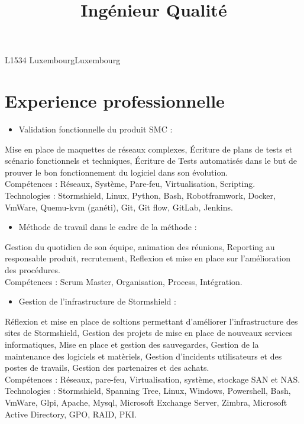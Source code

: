 

\title{Ingénieur Qualité} 
\address{57, rue de la forêt}{L1534 Luxembourg}{Luxembourg}


\makecvtitle
\section{Experience professionnelle}
		{
			\begin{itemize}
				\item Validation fonctionnelle du produit SMC :
			\end{itemize}
			Mise en place de maquettes de réseaux complexes, Écriture de plans de tests et scénario fonctionnels et techniques, Écriture de Tests automatisés dans le but de prouver le bon fonctionnement du logiciel dans son évolution.\\
			\textcolor{myblue}{Compétences : Réseaux, Système, Pare-feu, Virtualisation, Scripting.}\\
			\textcolor{myblue}{Technologies : Stormshield, Linux, Python, Bash, Robotframwork, Docker, VmWare, Quemu-kvm (ganéti), Git, Git flow, GitLab, Jenkins.}
			\begin{itemize}
				\item Méthode de travail dans le cadre de la méthode :
			\end{itemize}
			Gestion du quotidien de son équipe, animation des réunions, Reporting au responsable produit, recrutement, Reflexion et mise en place sur l'amélioration des procédures.\\
			\textcolor{myblue}{Compétences : Scrum Master, Organisation, Process, Intégration.}\\
		}
	    {
		    \begin{itemize}
				\item Gestion de l'infrastructure de Stormshield :
			\end{itemize}
			Réflexion et mise en place de soltions permettant d'améliorer l'infrastructure des sites de Stormshield, Gestion des projets de mise en place de nouveaux services informatiques, Mise en place et gestion des sauvegardes, Gestion de la maintenance des logiciels et matèriels, Gestion d'incidents utilisateurs et des postes de travails, Gestion des partenaires et des achats.\\
			\textcolor{myblue}{Compétences : Réseaux, pare-feu, Virtualisation, système, stockage SAN et NAS.}\\
			\textcolor{myblue}{Technologies : Stormshield, Spanning Tree, Linux, Windows, Powershell, Bash, VmWare, Glpi, Apache, Mysql, Microsoft Exchange Server, Zimbra, Microsoft Active Directory, GPO, RAID, PKI.}\\
		} 	
